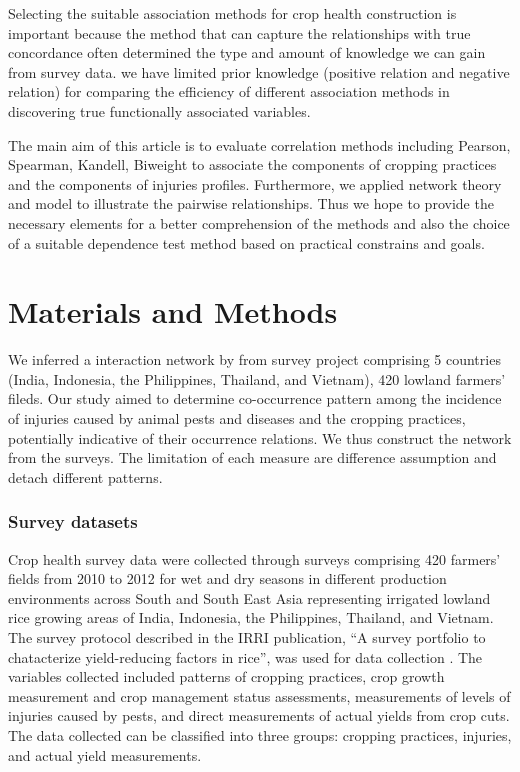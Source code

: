 \documentclass[a4paper]{article}
\begin{document}
Selecting the suitable association methods for crop health construction is important because the method that can capture the relationships with true concordance often determined the type and amount of knowledge we can gain from survey data.
we have limited prior knowledge (positive relation and negative relation) for comparing the efficiency of different association methods in discovering true functionally associated variables.

The main aim of this article is to evaluate correlation methods including Pearson, Spearman, Kandell, Biweight to associate the components of cropping practices and the components of injuries profiles. Furthermore, we applied network theory and model to illustrate the pairwise relationships. Thus we hope to provide the necessary elements for a better comprehension of the methods and also the choice of a suitable dependence test method based on practical constrains and goals.

\section*{Materials and Methods}

We inferred a interaction network by from survey project comprising 5 countries (India, Indonesia, the Philippines, Thailand, and Vietnam), 420 lowland farmers' fileds. Our study aimed to determine co-occurrence pattern among the incidence of injuries caused by animal pests and diseases and the cropping practices, potentially indicative of their occurrence relations. We thus construct the network from the surveys. The limitation of each measure are difference assumption and detach different patterns.

\subsubsection*{Survey datasets}
Crop health survey data were collected through surveys comprising 420 farmers' fields from 2010 to 2012 for wet and dry seasons in different production environments across South and South East Asia representing irrigated lowland rice growing areas of India, Indonesia, the Philippines, Thailand, and Vietnam. The survey protocol described in the IRRI publication, ``A survey  portfolio to chatacterize yield-reducing factors in rice'', was used for data collection \citep{Savarysurvey2009} . The variables collected included patterns of cropping practices, crop growth measurement and crop management status assessments, measurements of levels of injuries caused by pests, and direct measurements of actual yields from crop cuts. The data collected can be classified into three groups: cropping practices, injuries, and actual yield measurements.
\end{document}
